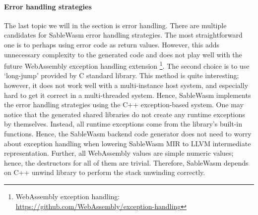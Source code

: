 \paragraph{Error handling strategies}
The last topic we will in the section is error handling. There are multiple candidates for SableWasm error handling strategies. The most straightforward one is to perhaps using error code as return values. However, this adds unnecessary complexity to the generated code and does not play well with the future WebAssembly exception handling extension \footnote{WebAssembly exception handling: \url{https://github.com/WebAssembly/exception-handling}}. The second choice is to use `long-jump' provided by C standard library. This method is quite interesting; however, it does not work well with a multi-instance host system, and especially hard to get it correct in a multi-threaded system. Hence, SableWasm implements the error handling strategies using the C++ exception-based system. One may notice that the generated shared libraries do not create any runtime exceptions by themselves. Instead, all runtime exceptions come from the library's built-in functions. Hence, the SableWasm backend code generator does not need to worry about exception handling when lowering SableWasm MIR to LLVM intermediate representation. Further, all WebAssembly values are simple numeric values; hence, the destructors for all of them are trivial. Therefore, SableWasm depends on C++ unwind library to perform the stack unwinding correctly.